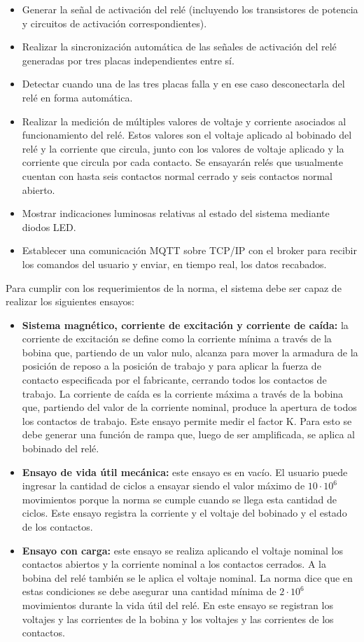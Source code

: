 \documentclass[11pt]{charter}
\begin{document}
\begin{itemize}
\item Generar la señal de activación del relé (incluyendo los transistores de potencia y circuitos de activación correspondientes).
\item Realizar la sincronización automática de las señales de activación del relé generadas por tres placas independientes entre sí.
\item Detectar cuando una de las tres placas falla y en ese caso desconectarla del relé en forma automática.
\item Realizar la medición de múltiples valores de voltaje y corriente asociados al funcionamiento del relé. Estos valores son el voltaje aplicado al bobinado del relé y la corriente que circula, junto con los valores de voltaje aplicado y la corriente que circula por cada contacto. Se ensayarán relés que usualmente cuentan con hasta seis contactos normal cerrado y seis contactos normal abierto.
\item Mostrar indicaciones luminosas relativas al estado del sistema mediante diodos LED.
\item Establecer una comunicación MQTT sobre TCP/IP con el broker para recibir los comandos del usuario y enviar, en tiempo real, los datos recabados.
\end{itemize}

Para cumplir con los requerimientos de la norma, el sistema debe ser capaz de realizar los siguientes ensayos:

\begin{itemize}
\item \textbf{Sistema magnético, corriente de excitación y corriente de caída:} la corriente de excitación se define como la corriente mínima a través de la bobina que, partiendo de un valor nulo, alcanza para mover la armadura de la posición de reposo a la posición de trabajo y para aplicar la fuerza de contacto especificada por el fabricante, cerrando todos los contactos de trabajo. La corriente de caída es la corriente máxima a través de la bobina que, partiendo del valor de la corriente nominal, produce la apertura de todos los contactos de trabajo. Este ensayo permite medir el factor K. Para esto se debe generar una función de rampa que, luego de ser amplificada, se aplica al bobinado del relé.
\item \textbf{Ensayo de vida útil mecánica:} este ensayo es en vacío. El usuario puede ingresar la cantidad de ciclos a ensayar siendo el valor máximo de $10 \cdot 10^6$ movimientos porque la norma se cumple cuando se llega esta cantidad de ciclos. Este ensayo registra la corriente y el voltaje del bobinado y el estado de los contactos.
\item \textbf{Ensayo con carga:} este ensayo se realiza aplicando el voltaje nominal los contactos abiertos y la corriente nominal a los contactos cerrados. A la bobina del relé también se le aplica el voltaje nominal. La norma dice que en estas condiciones se debe asegurar una cantidad mínima de $2 \cdot 10^6$ movimientos durante la vida útil del relé. En este ensayo se registran los voltajes y las corrientes de la bobina y los voltajes y las corrientes de los contactos.
\end{itemize}
\end{document}
